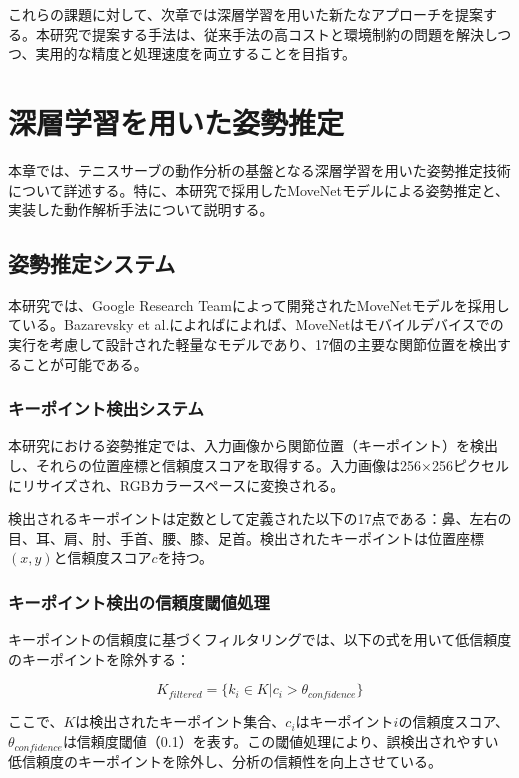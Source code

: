 \documentclass[oneside]{suribt}[11pt]
\begin{document}
これらの課題に対して、次章では深層学習を用いた新たなアプローチを提案する。本研究で提案する手法は、従来手法の高コストと環境制約の問題を解決しつつ、実用的な精度と処理速度を両立することを目指す。

\chapter{深層学習を用いた姿勢推定}

本章では、テニスサーブの動作分析の基盤となる深層学習を用いた姿勢推定技術について詳述する。特に、本研究で採用したMoveNetモデルによる姿勢推定と、実装した動作解析手法について説明する。

\section{姿勢推定システム}
本研究では、Google Research Teamによって開発されたMoveNetモデルを採用している。Bazarevsky et al.\cite{mediapipe}によればによれば、MoveNetはモバイルデバイスでの実行を考慮して設計された軽量なモデルであり、17個の主要な関節位置を検出することが可能である。

\subsection{キーポイント検出システム}
本研究における姿勢推定では、入力画像から関節位置（キーポイント）を検出し、それらの位置座標と信頼度スコアを取得する。入力画像は256×256ピクセルにリサイズされ、RGBカラースペースに変換される。

検出されるキーポイントは定数として定義された以下の17点である：鼻、左右の目、耳、肩、肘、手首、腰、膝、足首。検出されたキーポイントは位置座標$(x, y)$と信頼度スコア$c$を持つ。

\subsection{キーポイント検出の信頼度閾値処理}
キーポイントの信頼度に基づくフィルタリングでは、以下の式を用いて低信頼度のキーポイントを除外する：

\begin{equation}
K_{filtered} = \{k_i \in K | c_i > \theta_{confidence}\}
\end{equation}

ここで、$K$は検出されたキーポイント集合、$c_i$はキーポイント$i$の信頼度スコア、$\theta_{confidence}$は信頼度閾値（0.1）を表す。この閾値処理により、誤検出されやすい低信頼度のキーポイントを除外し、分析の信頼性を向上させている。
\end{document}
